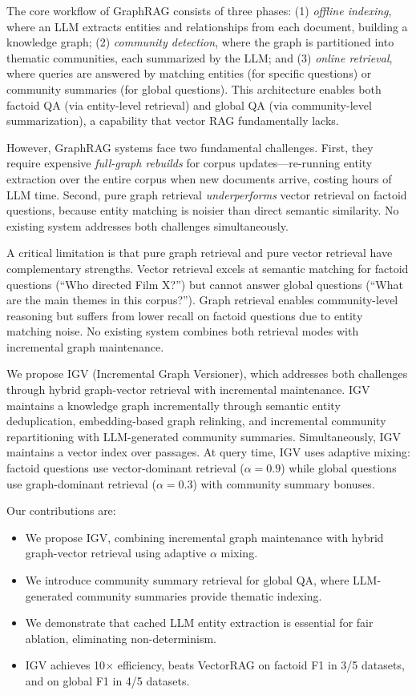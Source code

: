 \documentclass[sigconf,anonymous,review]{acmart}
\begin{document}
The core workflow of GraphRAG consists of three phases: (1) \emph{offline indexing}, where an LLM extracts entities and relationships from each document, building a knowledge graph; (2) \emph{community detection}, where the graph is partitioned into thematic communities, each summarized by the LLM; and (3) \emph{online retrieval}, where queries are answered by matching entities (for specific questions) or community summaries (for global questions). This architecture enables both factoid QA (via entity-level retrieval) and global QA (via community-level summarization), a capability that vector RAG fundamentally lacks.

However, GraphRAG systems face two fundamental challenges. First, they require expensive \emph{full-graph rebuilds} for corpus updates---re-running entity extraction over the entire corpus when new documents arrive, costing hours of LLM time. Second, pure graph retrieval \emph{underperforms} vector retrieval on factoid questions, because entity matching is noisier than direct semantic similarity. No existing system addresses both challenges simultaneously.

A critical limitation is that pure graph retrieval and pure vector retrieval have complementary strengths. Vector retrieval excels at semantic matching for factoid questions (``Who directed Film X?'') but cannot answer global questions (``What are the main themes in this corpus?''). Graph retrieval enables community-level reasoning but suffers from lower recall on factoid questions due to entity matching noise. No existing system combines both retrieval modes with incremental graph maintenance.

We propose IGV (Incremental Graph Versioner), which addresses both challenges through hybrid graph-vector retrieval with incremental maintenance. IGV maintains a knowledge graph incrementally through semantic entity deduplication, embedding-based graph relinking, and incremental community repartitioning with LLM-generated community summaries. Simultaneously, IGV maintains a vector index over passages. At query time, IGV uses adaptive mixing: factoid questions use vector-dominant retrieval ($\alpha{=}0.9$) while global questions use graph-dominant retrieval ($\alpha{=}0.3$) with community summary bonuses.

Our contributions are:
\begin{itemize}
\item We propose IGV, combining incremental graph maintenance with hybrid graph-vector retrieval using adaptive $\alpha$ mixing.
\item We introduce community summary retrieval for global QA, where LLM-generated community summaries provide thematic indexing.
\item We demonstrate that cached LLM entity extraction is essential for fair ablation, eliminating non-determinism.
\item IGV achieves 10$\times$ efficiency, beats VectorRAG on factoid F1 in 3/5 datasets, and on global F1 in 4/5 datasets.
\end{itemize}
\end{document}
